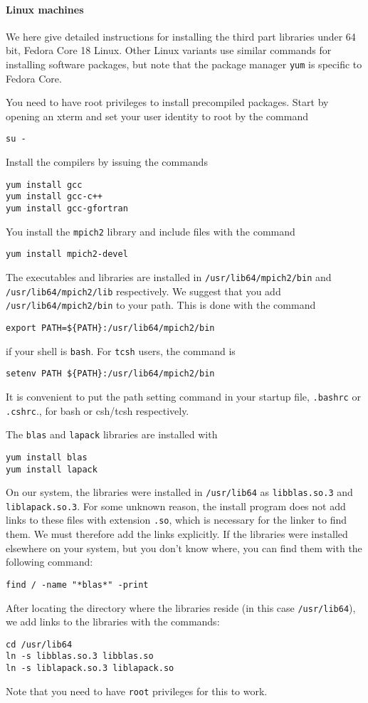 \documentclass[11pt]{article}
\begin{document}
\paragraph{Linux machines}
We here give detailed instructions for installing the third part libraries under 64 bit, Fedora Core
18 Linux. Other Linux variants use similar commands for installing software packages, but note that
the package manager \verb+yum+ is specific to Fedora Core.

You need to have root privileges to install precompiled packages. Start by opening an xterm and
set your user identity to root by the command
\begin{verbatim}
su -
\end{verbatim}
Install the compilers by issuing the commands
\begin{verbatim}
yum install gcc
yum install gcc-c++
yum install gcc-gfortran
\end{verbatim}
You install the \verb+mpich2+ library and include files with the command
\begin{verbatim}
yum install mpich2-devel
\end{verbatim}
The executables and libraries are installed in \verb+/usr/lib64/mpich2/bin+ and
\verb+/usr/lib64/mpich2/lib+ respectively. We suggest that you add \verb+/usr/lib64/mpich2/bin+ to
your path. This is done with the command
\begin{verbatim}
export PATH=${PATH}:/usr/lib64/mpich2/bin
\end{verbatim}
if your shell is \verb+bash+. For \verb+tcsh+ users, the command is
\begin{verbatim}
setenv PATH ${PATH}:/usr/lib64/mpich2/bin
\end{verbatim}
It is convenient to put the path setting command in
your startup file, \verb+.bashrc+ or \verb+.cshrc+., for bash or csh/tcsh respectively.

The \verb+blas+ and \verb+lapack+ libraries are installed with
\begin{verbatim}
yum install blas
yum install lapack
\end{verbatim}
On our system, the libraries were installed in \verb+/usr/lib64+ as \verb+libblas.so.3+ and
\verb+liblapack.so.3+. For some unknown reason, the install program does not add links to these
files with extension \verb+.so+, which is necessary for the linker to find them. We must therefore
add the links explicitly. If the libraries were installed elsewhere on your system, but you don't
know where, you can find them with the following command:
\begin{verbatim}
find / -name "*blas*" -print
\end{verbatim}
After locating the directory where the libraries reside (in this case \verb+/usr/lib64+), we add
links to the libraries with the commands:
\begin{verbatim}
cd /usr/lib64
ln -s libblas.so.3 libblas.so
ln -s liblapack.so.3 liblapack.so
\end{verbatim}
Note that you need to have \verb+root+ privileges for this to work.
\end{document}
